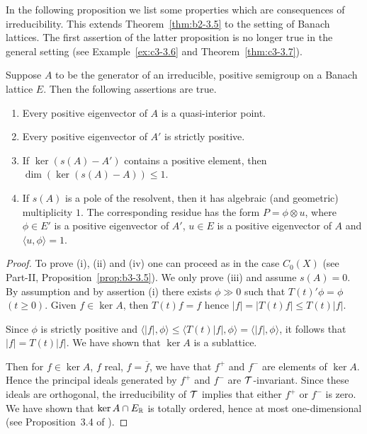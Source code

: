 In the following proposition we list some properties which are consequences of irreducibility. 
This extends Theorem~\ref{thm:b2-3.5} to the setting of Banach lattices. 
The first assertion of the latter proposition is no longer true in the general setting (see Example~\ref{ex:c3-3.6} and Theorem~\ref{thm:c3-3.7}). 
\begin{proposition}\label{prop:c3-3.5}
	
	Suppose $A$ to be the generator of an irreducible, positive semigroup on a Banach lattice $E$.
	Then the following assertions are true.
	\begin{enumerate}[\upshape (i)]
	\item 
	Every positive eigenvector of\/ $A$ is a quasi-interior point.
	
	\item 
	Every positive eigenvector of\/ $A'$ is strictly positive.
	
	\item 
	If $\ker(s(A) - A')$ contains a positive element, then $\dim(\ker(s(A) - A)) \leq 1$.
	
	\item If\/ $s(A)$ is a pole of the resolvent, then it has algebraic (and geometric) multiplicity $1$.
	The corresponding residue has the form $P = \phi\otimes u$, where $\phi \in E'$ is a positive eigenvector of\/ $A'$, $u \in E$ is a positive eigenvector of\/ $A$ and $\langle u,\phi \rangle = 1$.
	\end{enumerate}
\end{proposition}
\begin{proof}
    To prove (i), (ii) and (iv) one can proceed as in the case $C_{0}(X)$ (see Part-II, Proposition~\ref{prop:b3-3.5}).
    We only prove (iii) and assume $s(A) = 0$.
    By assumption and by assertion (i) there exists $\phi \gg 0$ such that $T(t)'\phi = \phi$ $(t\geq0)$.
    Given $f \in \ker A$, then $T(t)f = f$ hence $|f| = |T(t)f| \leq T(t)|f|$.
    
    Since $\phi$ is strictly positive and $\langle|f|,\phi\rangle \leq \langle T(t)|f|,\phi\rangle = \langle|f|,\phi\rangle$, it follows that $|f| = T(t)|f|$.
    We have shown that $\ker A$ is a sublattice.
    
    Then for $f \in \ker A$, $f$ real, \ie  $f = \overline{f}$, we have that $f^{+}$ and $f^{-}$ are elements of\/ $\ker A$.
    Hence the principal ideals generated by $f^{+}$ and $f^{-}$ are $\mathcal{T}$-invariant.
    Since these ideals are orthogonal, the irreducibility of\/ $\mathcal{T}$ implies that either $f^{+}$ or $f^{-}$ is zero.
    We have shown that $\ker A \cap E_{\mathbb{R} }$ is totally ordered, hence at most one-dimensional (see Proposition~3.4 of \textcite{schaefer:1974}).
\end{proof}
